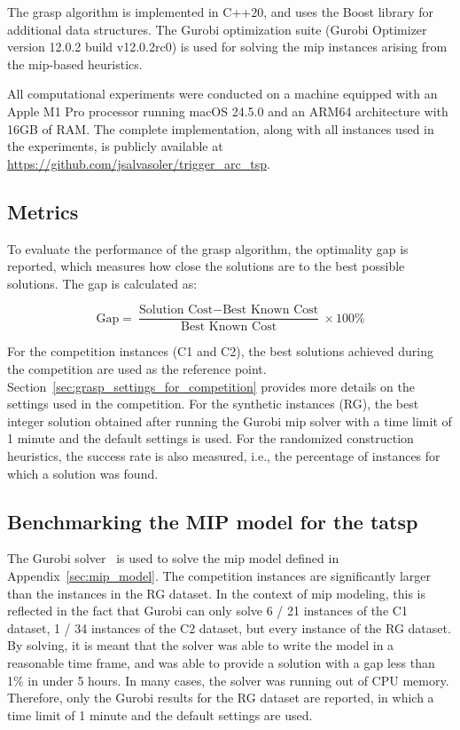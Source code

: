 \documentclass[twocolumn]{article} %
\begin{document}
The \gls{grasp} algorithm is implemented in C++20, and uses the Boost library for additional data structures.
The Gurobi optimization suite (Gurobi Optimizer version 12.0.2 build v12.0.2rc0) is used for solving the \gls{mip} instances arising from the \gls{mip}-based heuristics.

All computational experiments were conducted on a machine equipped with an Apple M1 Pro processor running macOS 24.5.0 and an ARM64 architecture with 16GB of RAM.
The complete implementation, along with all instances used in the experiments, is publicly available at \url{https://github.com/jsalvasoler/trigger_arc_tsp}.

\subsection{Metrics}

To evaluate the performance of the \gls{grasp} algorithm, the optimality gap is reported, which measures how close the solutions are to the best possible solutions. The gap is calculated as:

\begin{equation}
\text{Gap} = \frac{\text{Solution Cost} - \text{Best Known Cost}}{\text{Best Known Cost}} \times 100\%
\end{equation}

For the competition instances (C1 and C2), the best solutions achieved during the competition are used as the reference point. Section~\ref{sec:grasp_settings_for_competition} provides more details on the settings used in the competition.
For the synthetic instances (RG), the best integer solution obtained after running the Gurobi \gls{mip} solver with a time limit of 1 minute and the default settings is used.
For the randomized construction heuristics, the success rate is also measured, i.e., the percentage of instances for which a solution was found.

\subsection{Benchmarking the MIP model for the \gls{tatsp}}

The Gurobi solver~\cite{gurobi} is used to solve the \gls{mip} model defined in Appendix~\ref{sec:mip_model}.
The competition instances are significantly larger than the instances in the RG dataset. In the context of \gls{mip} modeling, this is reflected in the fact
that Gurobi can only solve 6 / 21 instances of the C1 dataset, 1 / 34 instances of the C2 dataset, but every instance of the RG dataset.
By solving, it is meant that the solver was able to write the model in a reasonable time frame, and was able to provide a solution with a gap less than 1\% in under 5 hours.
In many cases, the solver was running out of CPU memory.
Therefore, only the Gurobi results for the RG dataset are reported, in which a time limit of 1 minute and the default settings are used.
\end{document}
